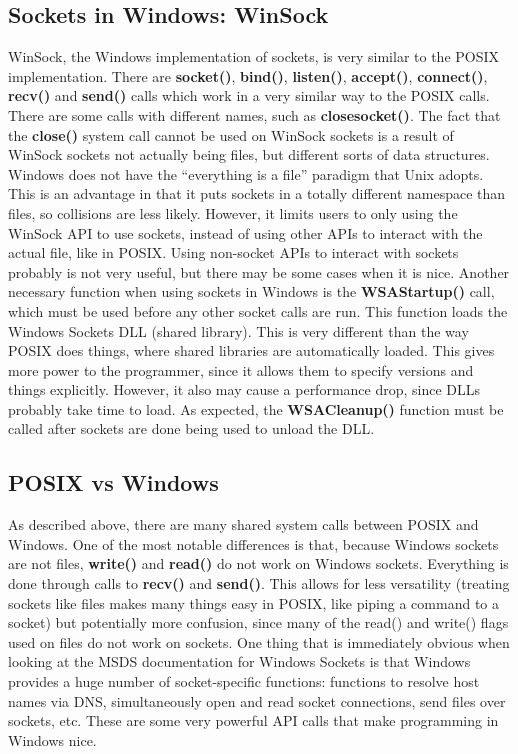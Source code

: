 \documentclass[11pt]{article}
\begin{document}
\subsection{Sockets in Windows: WinSock}
WinSock, the Windows implementation of sockets, is very similar to the POSIX implementation. There are \textbf{socket()}, \textbf{bind()}, \textbf{listen()}, \textbf{accept()}, \textbf{connect()}, \textbf{recv()} and \textbf{send()} calls which work in a very similar way to the POSIX calls. There are some calls with different names, such as \textbf{closesocket()}. The fact that the \textbf{close()} system call cannot be used on WinSock sockets is a result of WinSock sockets not actually being files, but different sorts of data structures. Windows does not have the ``everything is a file'' paradigm that Unix adopts. This is an advantage in that it puts sockets in a totally different namespace than files, so collisions are less likely. However, it limits users to only using the WinSock API to use sockets, instead of using other APIs to interact with the actual file, like in POSIX. Using non-socket APIs to interact with sockets probably is not very useful, but there may be some cases when it is nice. Another necessary function when using sockets in Windows is the \textbf{WSAStartup()} call, which must be used before any other socket calls are run. This function loads the Windows Sockets DLL (shared library). This is very different than the way POSIX does things, where shared libraries are automatically loaded. This gives more power to the programmer, since it allows them to specify versions and things explicitly. However, it also may cause a performance drop, since DLLs probably take time to load. As expected, the \textbf{WSACleanup()} function must be called after sockets are done being used to unload the DLL.\\

\subsection{POSIX vs Windows}
As described above, there are many shared system calls between POSIX and Windows. One of the most notable differences is that, because Windows sockets are not files, \textbf{write()} and \textbf{read()} do not work on Windows sockets. Everything is done through calls to \textbf{recv()} and \textbf{send()}. This allows for less versatility (treating sockets like files makes many things easy in POSIX, like piping a command to a socket) but potentially more confusion, since many of the read() and write() flags used on files do not work on sockets. One thing that is immediately obvious when looking at the MSDS documentation for Windows Sockets is that Windows provides a huge number of socket-specific functions: functions to resolve host names via DNS, simultaneously open and read socket connections, send files over sockets, etc. These are some very powerful API calls that make programming in Windows nice.\\
\end{document}

